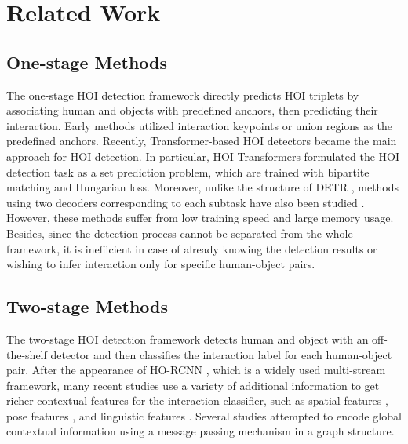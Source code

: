 \documentclass[10pt,twocolumn,letterpaper]{article}
\begin{document}
\section{Related Work}
\label{sec:formatting}

\subsection {One-stage Methods}
The one-stage HOI detection framework directly predicts HOI triplets by associating human and objects with predefined anchors, then predicting their interaction. Early methods utilized interaction keypoints \cite{liao2020ppdm, wang2020learning} or union regions \cite{kim2020uniondet} as the predefined anchors. Recently, Transformer-based HOI detectors \cite{kim2021hotr, tamura2021qpic} became the main approach for HOI detection. In particular, HOI Transformers formulated the HOI detection task as a set prediction problem, which are trained with bipartite matching and Hungarian loss. Moreover, unlike the structure of DETR \cite{carion2020end}, methods using two decoders corresponding to each subtask have also been studied \cite{liao2022gen, chen2021reformulating, zhou2022human, zhang2021mining}. However, these methods suffer from low training speed and large memory usage. Besides, since the detection process cannot be separated from the whole framework, it is inefficient in case of already knowing the detection results or wishing to infer interaction only for specific human-object pairs.
\subsection {Two-stage Methods}
The two-stage HOI detection framework detects human and object with an off-the-shelf detector \cite{ren2015faster} and then classifies the interaction label for each human-object pair. 
After the appearance of HO-RCNN \cite{chao2018learning}, which is a widely used multi-stream framework, many recent studies use a variety of additional information to get richer contextual features for the interaction classifier, such as spatial features \cite{gao2020drg, zhang2021spatially, ulutan2020vsgnet}, pose features \cite{gupta2019no, li2019transferable, wan2019pose}, and linguistic features \cite{gao2020drg, liu2020consnet}. Several studies \cite{gao2020drg, qi2018learning, ulutan2020vsgnet, zhang2021spatially, wang2020contextual} attempted to encode global contextual information using a message passing mechanism in a graph structure. 
\end{document}

